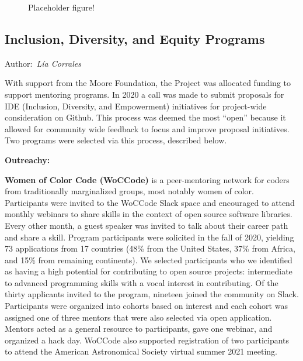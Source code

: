 \documentclass[modern]{aastex631}
\newcommand{\secauthor}[1]{{\color{blue}Author:~\textit{#1}}}
\begin{document}
\begin{figure}
    \begin{centering}
        \caption{Placeholder figure!}
        \label{fig:contributor-summary}
    \end{centering}
\end{figure}


\subsection{Inclusion, Diversity, and Equity Programs} \label{sec:project-ide}

\secauthor{Lía Corrales}

With support from the Moore Foundation, the \astropy Project was
allocated funding to support mentoring programs. In 2020 a call was
made to submit proposals for IDE (Inclusion, Diversity, and
Empowerment) initiatives for project-wide consideration on
Github. This process was deemed the most ``open'' because it allowed
for community wide feedback to focus and improve proposal
initiatives. Two programs were selected via this process, described
below.

\textbf{Outreachy:} 

\textbf{Women of Color Code (WoCCode)} is a peer-mentoring network for
coders from traditionally marginalized groups, most notably women of
color. Participants were invited to the WoCCode Slack space and
encouraged to attend monthly webinars to share skills in the context
of open source software libraries. Every other month, a guest speaker
was invited to talk about their career path and share a skill. Program
participants were solicited in the fall of 2020, yielding 73
applications from 17 countries (48\% from the United States, 37\% from
Africa, and 15\% from remaining continents). We selected participants
who we identified as having a high potential for contributing to open
source projects: intermediate to advanced programming skills with a
vocal interest in contributing. Of the thirty applicants invited to
the program, nineteen joined the community on Slack. Participants were
organized into cohorts based on interest and each cohort was assigned
one of three mentors that were also selected via open
application. Mentors acted as a general resource to participants, gave
one webinar, and organized a hack day. WoCCode also supported
registration of two participants to attend the American Astronomical
Society virtual summer 2021 meeting.
\end{document}
